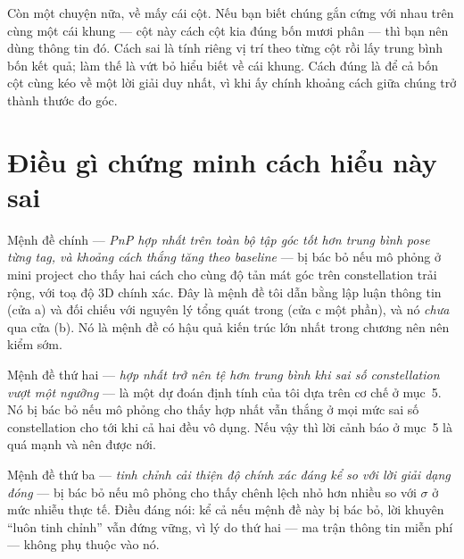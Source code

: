 \documentclass[../../marker.tex]{subfiles}
\begin{document}
\begin{dongian}
Còn một chuyện nữa, về mấy cái cột. Nếu bạn biết chúng gắn cứng với nhau trên cùng một cái khung --- cột này cách cột kia đúng bốn mươi phân --- thì bạn nên dùng thông tin đó. Cách sai là tính riêng vị trí theo từng cột rồi lấy trung bình bốn kết quả; làm thế là vứt bỏ hiểu biết về cái khung. Cách đúng là để cả bốn cột cùng kéo về một lời giải duy nhất, vì khi ấy chính khoảng cách giữa chúng trở thành thước đo góc.

\end{dongian}

\section{Điều gì chứng minh cách hiểu này sai}

Mệnh đề chính --- \emph{PnP hợp nhất trên toàn bộ tập góc tốt hơn trung bình pose từng tag, và khoảng cách thắng tăng theo baseline} --- bị bác bỏ nếu mô phỏng ở mini project cho thấy hai cách cho cùng độ tản mát góc trên constellation trải rộng, với toạ độ 3D chính xác. Đây là mệnh đề tôi dẫn bằng lập luận thông tin (cửa a) và đối chiếu với nguyên lý tổng quát trong \cite[§2]{triggs2000bundle} (cửa c một phần), và nó \emph{chưa} qua cửa (b). Nó là mệnh đề có hậu quả kiến trúc lớn nhất trong chương nên nên kiểm sớm.

Mệnh đề thứ hai --- \emph{hợp nhất trở nên tệ hơn trung bình khi sai số constellation vượt một ngưỡng} --- là một dự đoán định tính của tôi dựa trên cơ chế ở mục~5. Nó bị bác bỏ nếu mô phỏng cho thấy hợp nhất vẫn thắng ở mọi mức sai số constellation cho tới khi cả hai đều vô dụng. Nếu vậy thì lời cảnh báo ở mục~5 là quá mạnh và nên được nới.

Mệnh đề thứ ba --- \emph{tinh chỉnh cải thiện độ chính xác đáng kể so với lời giải dạng đóng} --- bị bác bỏ nếu mô phỏng cho thấy chênh lệch nhỏ hơn nhiều so với \(\sigma\) ở mức nhiễu thực tế. Điều đáng nói: kể cả nếu mệnh đề này bị bác bỏ, lời khuyên ``luôn tinh chỉnh'' vẫn đứng vững, vì lý do thứ hai --- ma trận thông tin miễn phí --- không phụ thuộc vào nó.
\end{document}
